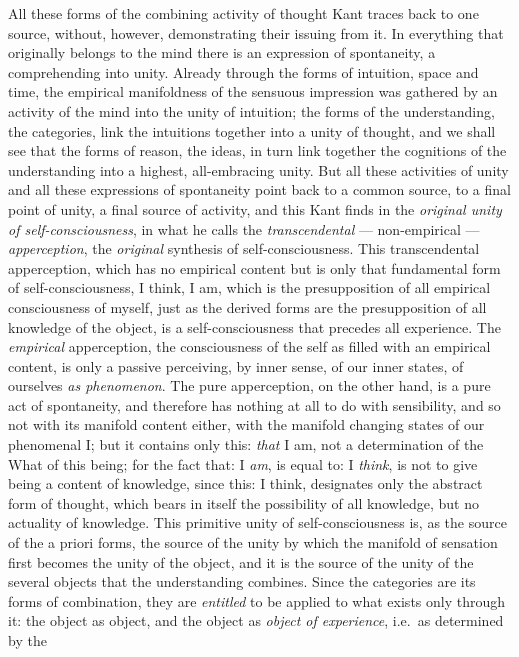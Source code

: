 All these forms of the combining activity of thought Kant traces back to
one source, without, however, demonstrating their issuing from it. In
everything that originally belongs to the mind there is an expression of
spontaneity, a comprehending into unity. Already through the forms of
intuition, space and time, the empirical manifoldness of the sensuous
impression was gathered by an activity of the mind into the unity of
intuition; the
forms of the understanding, the categories, link the intuitions together
into a unity of thought, and we shall see that the forms of reason, the
ideas, in turn link together the cognitions of the understanding into a
highest, all-embracing unity. But all these activities of unity and all
these expressions of spontaneity point back to a common source, to a
final point of unity, a final source of activity, and this Kant finds in
the \emph{original unity of self-consciousness}, in what he calls the
\emph{transcendental} --- non-empirical --- \emph{apperception}, the
\emph{original} synthesis of self-consciousness. This transcendental
apperception, which has no empirical content but is only that
fundamental form of self-consciousness, I think, I am, which is the
presupposition of all empirical consciousness of myself, just as the
derived forms are the presupposition of all knowledge of the object, is a
self-consciousness that precedes all experience. The \emph{empirical}
apperception, the consciousness of the self as filled with an empirical
content, is only a passive perceiving, by inner sense, of our inner
states, of ourselves \emph{as phenomenon}. The pure apperception, on the
other hand, is a pure act of spontaneity, and therefore has nothing at
all to do with sensibility, and so not with its manifold content either,
with the manifold changing states of our phenomenal I; but it contains
only this: \emph{that} I am, not a determination of the What of this
being; for the fact that: I \emph{am}, is equal to: I \emph{think}, is
not to give being a content of knowledge, since this: I think, designates
only the abstract form of thought, which bears in itself the possibility
of all knowledge, but no actuality of knowledge. This primitive unity of
self-consciousness is, as the source of the a priori forms, the source of
the unity by which the manifold of sensation first becomes the unity of
the object, and it is the source of the unity of the several objects that
the understanding combines. Since the categories are its forms of
combination, they are \emph{entitled} to be applied to what exists only
through it: the object as object, and the object as \emph{object of
experience}, i.e.\ as determined by the

